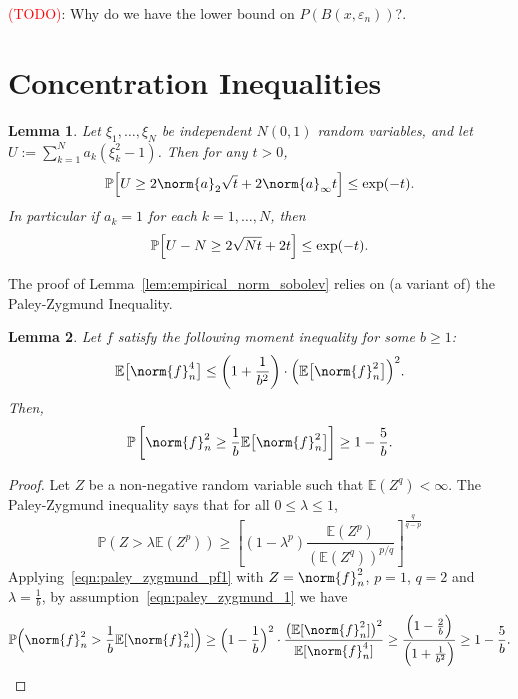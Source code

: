 \documentclass[twoside]{article}
\newcommand{\1}{\mathbf{1}}
\newcommand{\Pbb}{\mathbb{P}}
\newcommand{\Ebb}{\mathbb{E}}
\newtheorem{lemma}{Lemma}
\theoremstyle{definition}
\theoremstyle{remark}
\begin{document}
\textcolor{red}{(TODO)}: Why do we have the lower bound on $P(B(x,\varepsilon_n))$?.


\section{Concentration Inequalities}
\label{sec:concentration}
\begin{lemma}
	\label{lem:chi_square_bound}
	Let $\xi_1,\ldots,\xi_N$ be independent $N(0,1)$ random variables, and let $U := \sum_{k = 1}^{N} a_k(\xi_k^2 - 1)$.  Then for any $t > 0$,
	\begin{equation*}
	\Pbb\Bigl[U \geq 2 \norm{a}_2 \sqrt{t} + 2 \norm{a}_{\infty}t\Bigr] \leq \exp(-t).
	\end{equation*}
	In particular if $a_k = 1$ for each $k = 1,\ldots,N$, then
	\begin{equation*}
	\Pbb\Bigl[U - N \geq 2\sqrt{N t} + 2t\Bigr] \leq \exp(-t).
	\end{equation*}
\end{lemma}

The proof of Lemma~\ref{lem:empirical_norm_sobolev} relies on (a variant of) the Paley-Zygmund Inequality.
\begin{lemma}
	\label{lem:paley_zygmund}
	Let $f$ satisfy the following moment inequality for some $b \geq 1$:
	\begin{equation}
	\label{eqn:paley_zygmund_1}
	\Ebb\bigl[\norm{f}_n^4\bigr] \leq \left(1 + \frac{1}{b^2}\right)\cdot\Bigl(\Ebb\bigl[\norm{f}_n^2\bigr]\Bigr)^2.
	\end{equation}
	Then,
	\begin{equation}
	\label{eqn:paley_zygmund_2}
	\mathbb{P}\left[\norm{f}_n^2 \geq \frac{1}{b} \Ebb\bigl[\norm{f}_n^2\bigr]\right] \geq 1 - \frac{5}{b}.
	\end{equation}
\end{lemma}
\begin{proof}
	Let $Z$ be a non-negative random variable such that $\mathbb{E}(Z^q) < \infty$. The Paley-Zygmund inequality says that for all $0 \leq \lambda \leq 1$,
	\begin{equation}
	\label{eqn:paley_zygmund_pf1}
	\mathbb{P}(Z > \lambda \mathbb{E}(Z^p)) \geq \left[(1 - \lambda^p) \frac{\mathbb{E}(Z^p)}{(\mathbb{E}(Z^q))^{p/q}}\right]^{\frac{q}{q - p}}
	\end{equation}
	Applying~\eqref{eqn:paley_zygmund_pf1} with $Z = \norm{f}_n^2$, $p = 1$, $q = 2$ and $\lambda = \frac{1}{b}$, by assumption~\eqref{eqn:paley_zygmund_1} we have
	\begin{equation*}
	\mathbb{P}\Bigl(\norm{f}_n^2 > \frac{1}{b} \mathbb{E}[\norm{f}_n^2]\Bigr) \geq \Bigl(1 - \frac{1}{b}\Bigr)^2 \cdot  \frac{\bigl(\mathbb{E}[\norm{f}_n^2]\bigr)^2}{\mathbb{E}[\norm{f}_n^4]} \geq \frac{\Bigl(1 - \frac{2}{b}\Bigr)}{\Bigl(1 + \frac{1}{b^2}\Bigr)} \geq 1 - \frac{5}{b}.
	\end{equation*}
\end{proof}
\end{document}
